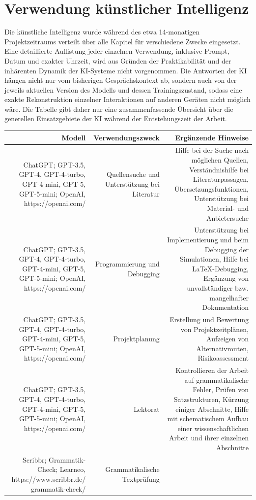\documentclass[12pt, a4paper]{article}
\begin{document}
\section*{Verwendung künstlicher Intelligenz}
Die künstliche Intelligenz wurde während des etwa 14-monatigen Projektzeitraums verteilt über alle Kapitel für verschiedene Zwecke eingesetzt. Eine detaillierte Auflistung jeder einzelnen Verwendung, inklusive Prompt, Datum und exakter Uhrzeit, wird aus Gründen der Praktikabilität und der inhärenten Dynamik der KI-Systeme nicht vorgenommen. Die Antworten der KI hängen nicht nur vom bisherigen Gesprächskontext ab, sondern auch von der jeweils aktuellen Version des Modells und dessen Trainingszustand, sodass eine exakte Rekonstruktion einzelner Interaktionen auf anderen Geräten nicht möglich wäre. Die Tabelle gibt daher nur eine zusammenfassende Übersicht über die generellen Einsatzgebiete der KI während der Entstehungszeit der Arbeit.
\begin{center}
	\begin{tabularx}{\textwidth}{||r|r|r||} 
		\hline
		Modell & Verwendungszweck & Ergänzende Hinweise\\ [0.5ex] 
		\hline\hline
		ChatGPT; GPT-3.5, GPT-4, GPT-4-turbo, GPT-4-mini, GPT-5, GPT-5-mini; OpenAI, https://openai.com/  & Quellensuche und Unterstützung bei Literatur  & Hilfe bei der Suche nach möglichen Quellen, Verständnishilfe bei Literaturpassagen, Übersetzungsfunktionen, Unterstützung bei Material- und Anbietersuche      \\ 
		\hline
		ChatGPT; GPT-3.5, GPT-4, GPT-4-turbo, GPT-4-mini, GPT-5, GPT-5-mini; OpenAI, https://openai.com/  & Programmierung und Debugging & Unterstützung bei Implementierung und beim Debugging der Simulationen, Hilfe bei LaTeX-Debugging, Ergänzung von unvollständiger bzw. mangelhafter Dokumentation\\
		\hline
		ChatGPT; GPT-3.5, GPT-4, GPT-4-turbo, GPT-4-mini, GPT-5, GPT-5-mini; OpenAI, https://openai.com/  & Projektplanung & Erstellung und Bewertung von Projektzeitplänen, Aufzeigen von Alternativrouten, Risikoassessment \\
		\hline
		ChatGPT; GPT-3.5, GPT-4, GPT-4-turbo, GPT-4-mini, GPT-5, GPT-5-mini; OpenAI, https://openai.com/  & Lektorat & Kontrollieren der Arbeit auf grammatikalische Fehler, Prüfen von Satzstrukturen, Kürzung einiger Abschnitte, Hilfe mit schematischem Aufbau einer wissenschaftlichen Arbeit und ihrer einzelnen Abschnitte \\
		\hline
		Scribbr; Grammatik- Check; Learneo, https://www.scribbr.de/ grammatik-check/  & Grammatikalische Textprüfung & \\   [1ex] 
		\hline
	\end{tabularx}
\end{center}
\end{document}
